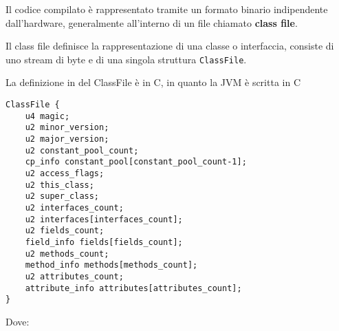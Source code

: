Il codice compilato è rappresentato tramite un formato binario indipendente dall'hardware, generalmente all'interno di un file chiamato \textbf{class file}.

Il class file definisce la rappresentazione di una classe o interfaccia, consiste di uno stream di byte e di una singola struttura \texttt{ClassFile}.

La definizione in del ClassFile è in C, in quanto la JVM è scritta in C
\begin{verbatim}
ClassFile {
    u4 magic;
    u2 minor_version;
    u2 major_version;
    u2 constant_pool_count;
    cp_info constant_pool[constant_pool_count-1];
    u2 access_flags;
    u2 this_class;
    u2 super_class;
    u2 interfaces_count;
    u2 interfaces[interfaces_count];
    u2 fields_count;
    field_info fields[fields_count];
    u2 methods_count;
    method_info methods[methods_count];
    u2 attributes_count;
    attribute_info attributes[attributes_count];
}
\end{verbatim}
Dove:
